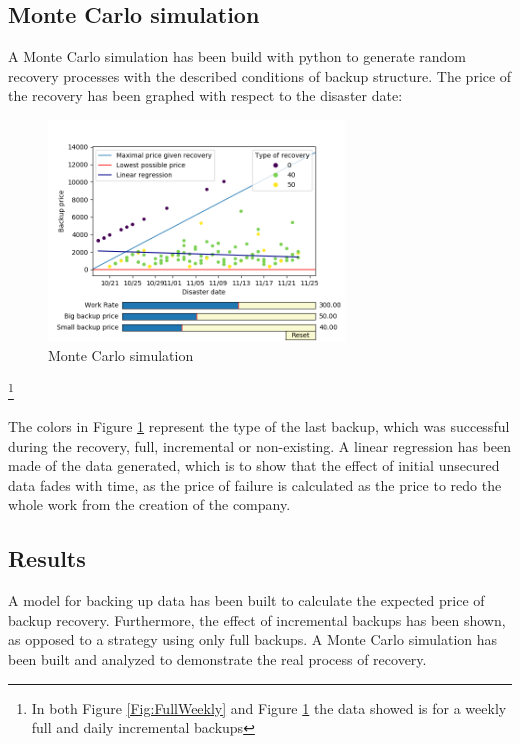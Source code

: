 \documentclass[11pt, a4paper]{article}
\theoremstyle{definition}
\newcommand\blfootnote[1]{%
	\begingroup
	\renewcommand\thefootnote{}\footnote{#1}%
	\addtocounter{footnote}{-1}%
	\endgroup
}
\begin{document}
\subsection{Monte Carlo simulation}
A Monte Carlo simulation has been build with python to generate random recovery processes with the described conditions of backup structure. The price of the recovery has been graphed with respect to the disaster date:
\begin{figure}[H]
	\begin{minipage}{1.0\textwidth}
		\centering
		\includegraphics[width=0.7\textwidth]{Weekly_full_carlo.png}
		\caption{Monte Carlo simulation}\label{Fig:MonteCarlo}
	\end{minipage}
\end{figure}
\blfootnote{In both Figure \ref{Fig:FullWeekly} and Figure \ref{Fig:MonteCarlo} the data showed is for a weekly full and daily incremental backups}
The colors in Figure \ref{Fig:MonteCarlo} represent the type of the last backup, which was successful during the recovery, full, incremental or non-existing.
\newpage
A linear regression has been made of the data generated, which is to show that the effect of initial unsecured data fades with time, as the price of failure is calculated as the price to redo the whole work from the creation of the company.
\subsection{Results}
A model for backing up data has been built to calculate the expected price of backup recovery. Furthermore, the effect of incremental backups has been shown, as opposed to a strategy using only full backups. A Monte Carlo simulation has been built and analyzed to demonstrate the real process of recovery.
\end{document}

